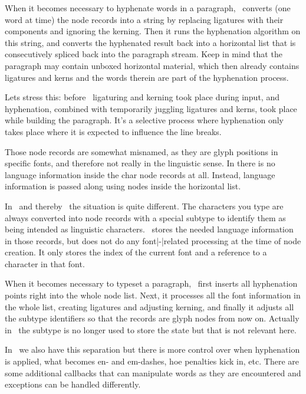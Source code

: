 When it becomes necessary to hyphenate words in a paragraph, \TEX\ converts (one
word at time) the  node records into a string by replacing ligatures
with their components and ignoring the kerning. Then it runs the hyphenation
algorithm on this string, and converts the hyphenated result back into a \quote
{horizontal list} that is consecutively spliced back into the paragraph stream.
Keep in mind that the paragraph may contain unboxed horizontal material, which
then already contains ligatures and kerns and the words therein are part of the
hyphenation process.

Lets stress this: before \LUATEX\ ligaturing and kerning took place during input,
and hyphenation, combined with temporarily juggling ligatures and kerns, took
place while building the paragraph. It's a selective process where hyphenation
only takes place where it is expected to influence the line breaks.

Those  node records are somewhat misnamed, as they are glyph
positions in specific fonts, and therefore not really  in the
linguistic sense. In  there is no language information inside the \type
{char} node records at all. Instead, language information is passed along using
 nodes inside the horizontal list.

In \LUATEX\ and thereby \LUAMETATEX\ the situation is quite different. The
characters you type are always converted into  node records with a
special subtype to identify them as being intended as linguistic characters.
\LUATEX\ stores the needed language information in those records, but does not do
any font|-|related processing at the time of node creation. It only stores the
index of the current font and a reference to a character in that font.

When it becomes necessary to typeset a paragraph, \LUATEX\ first inserts all
hyphenation points right into the whole node list. Next, it processes all the
font information in the whole list, creating ligatures and adjusting kerning, and
finally it adjusts all the subtype identifiers so that the records are \quote
{glyph nodes} from now on. Actually in \LUAMETATEX\ the subtype is no longer used
to store the state but that is not relevant here.

In \LUAMETATEX\ we also have this separation but there is more control over when
hyphenation is applied, what becomes en- and em-dashes, hoe penalties kick in,
etc. There are some additional callbacks that can manipulate words as they are
encountered and exceptions can be handled differently.

